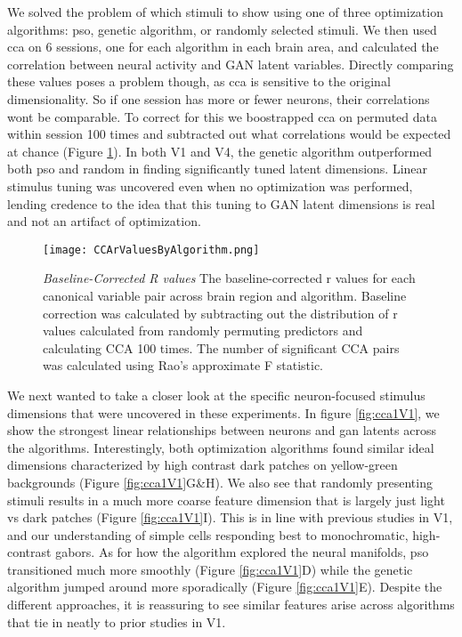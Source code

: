 We solved the problem of which stimuli to show using one of three optimization algorithms: \gls{pso}, genetic algorithm, or randomly selected stimuli. We then used \gls{cca} on 6 sessions, one for each algorithm in each brain area, and calculated the correlation between neural activity and GAN latent variables. Directly comparing these values poses a problem though, as \gls{cca} is sensitive to the original dimensionality. So if one session has more or fewer neurons, their correlations wont be comparable. To correct for this we boostrapped \gls{cca} on permuted data within session 100 times and subtracted out what correlations would be expected at chance (Figure \ref{fig:ccaR}). In both V1 and V4, the genetic algorithm outperformed both \gls{pso} and random in finding significantly tuned latent dimensions. Linear stimulus tuning was uncovered even when no optimization was performed, lending credence to the idea that this tuning to GAN latent dimensions is real and not an artifact of optimization.

\begin{figure}
	\centering
	\texttt{[image: CCArValuesByAlgorithm.png]}
	{\caption{{\it Baseline-Corrected R values} The baseline-corrected r values for each canonical variable pair across brain region and algorithm. Baseline correction was calculated by subtracting out the distribution of r values calculated from randomly permuting predictors and calculating CCA 100 times. The number of significant CCA pairs was calculated using Rao's approximate F statistic.}
	\label{fig:ccaR}}
\end{figure}

We next wanted to take a closer look at the specific neuron-focused stimulus dimensions that were uncovered in these experiments. In figure \ref{fig:cca1V1}, we show the strongest linear relationships between neurons and \gls{gan} latents across the algorithms. Interestingly, both optimization algorithms found similar ideal dimensions characterized by high contrast dark patches on yellow-green backgrounds (Figure \ref{fig:cca1V1}G\&H). We also see that randomly presenting stimuli results in a much more coarse feature dimension that is largely just light vs dark patches (Figure \ref{fig:cca1V1}I). This is in line with previous studies in V1, and our understanding of simple cells responding best to monochromatic, high-contrast gabors. As for how the algorithm explored the neural manifolds, \gls{pso} transitioned much more smoothly (Figure \ref{fig:cca1V1}D) while the genetic algorithm jumped around more sporadically (Figure \ref{fig:cca1V1}E). Despite the different approaches, it is reassuring to see similar features arise across algorithms that tie in neatly to prior studies in V1.

